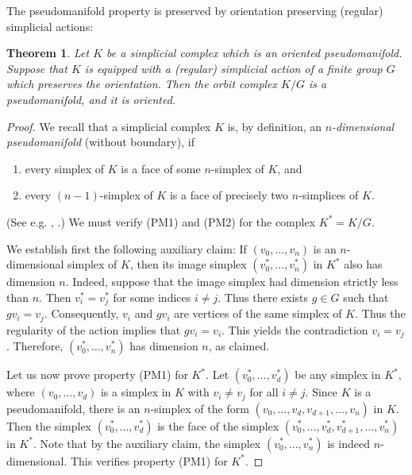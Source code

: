 \documentclass{amsart}
\newtheorem{thm}{Theorem}[section]
\theoremstyle{definition}
\theoremstyle{remark}
\begin{document}
The pseudomanifold property is preserved by orientation preserving
(regular) simplicial actions:
\begin{thm} \label{thm.orbitspacepseudomanifold}
Let $K$ be a simplicial complex which is an oriented pseudomanifold.
Suppose that $K$ is equipped with a (regular) simplicial
action of a finite group $G$ which preserves the orientation. 
Then the orbit complex $K/G$ is a pseudomanifold, and it is oriented.
\end{thm}
\begin{proof}
We recall that a simplicial complex $K$ is, by definition, an 
\emph{$n$-dimensional pseudomanifold} (without boundary),
if 
\begin{enumerate}
\item[(PM1)] every simplex of $K$ is a face of some $n$-simplex of $K$, and
\item[(PM2)] every $(n-1)$-simplex of $K$ is a face of precisely two $n$-simplices
 of $K$.
\end{enumerate}
(See e.g. \cite[p. 137]{gmih1}, \cite[p. 74, Examples 4.1.3]{banagltiss}.)
We must verify (PM1) and (PM2) for the complex $K^* = K/G$.

We establish first the following auxiliary claim:
If $(v_0, \ldots, v_n)$ is an $n$-dimensional simplex of $K$,
then its image simplex $(v^*_0, \ldots, v^*_n)$ in $K^*$
also has dimension $n$.
Indeed, suppose that the image simplex had dimension strictly less than $n$.
Then $v^*_i = v^*_j$ for some indices $i\not= j$.
Thus there exists $g\in G$ such that $gv_i = v_j$.
Consequently, $v_i$ and $gv_i$ are vertices of the same simplex of $K$.
Thus the regularity of the action implies that $gv_i = v_i$.
This yields the contradiction $v_i = v_j$. Therefore,
$(v^*_0, \ldots, v^*_n)$ has dimension $n$, as claimed.

Let us now prove property (PM1) for $K^*$.
Let $(v^*_0, \ldots, v^*_d)$ be any simplex in $K^*$,
where $(v_0,\ldots, v_d)$ is a simplex in $K$
with $v_i \not= v_j$ for all $i\not= j$.
Since $K$ is a pseudomanifold, there is an $n$-simplex
of the form 
$(v_0,\ldots, v_d, v_{d+1}, \ldots, v_n)$ in $K$.
Then the simplex $(v^*_0, \ldots, v^*_d)$ is the face of the simplex 
$(v^*_0,\ldots, v^*_d, v^*_{d+1}, \ldots, v^*_n)$ in $K^*$.
Note that by the auxiliary claim, the simplex
$(v^*_0,\ldots, v^*_n)$ is indeed $n$-dimensional.
This verifies property (PM1) for $K^*$.


\end{proof}
\end{document}
